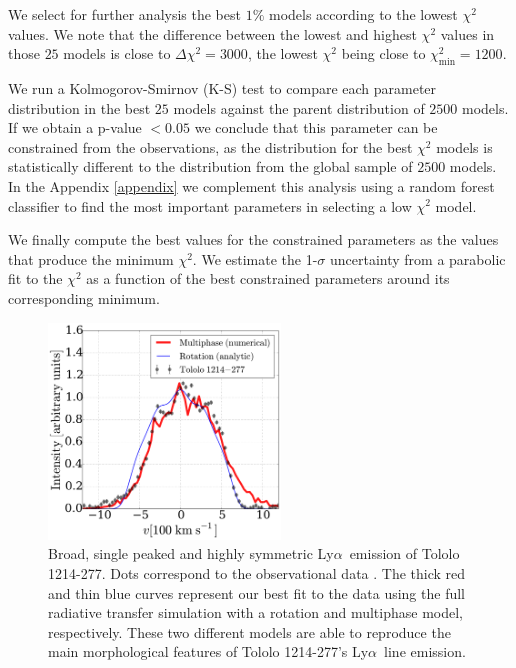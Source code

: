 \documentclass[a4paper,fleqn,usenatbib]{mnras}
\newcommand{\tol}{Tololo 1214-277}
\newcommand{\lya}{\ifmmode{{\rm Ly}\alpha}\else Ly$\alpha$\ \fi}
\begin{document}
We select for further analysis the best $1\%$ models according to the
lowest $\chi^2$ values.
We note that the difference between the lowest and highest $\chi^2$ values in
those $25$ models is close to $\Delta\chi^2 = 3000$, the lowest
$\chi^2$ being close to $\chi^2_{\mathrm{min}}=1200$. 

We run a Kolmogorov-Smirnov (K-S) test to compare each parameter
distribution in the best $25$ models against the parent distribution
of $2500$ models. 
If we obtain a p-value $<0.05$ we conclude that
this parameter can be constrained from the observations, as the distribution for
the best $\chi^2$ models is statistically different to the
distribution from the global sample of $2500$ models.  
In the Appendix \ref{appendix} we complement this analysis using a
random forest classifier to find the most important parameters in
selecting a low $\chi^2$ model.    


We finally compute the best values for the constrained parameters as
the values that produce the minimum $\chi^2$.  
We estimate the 1-$\sigma$ uncertainty from a parabolic fit to the
$\chi^2$ as a function of the best constrained parameters around its
corresponding minimum.   



\begin{figure}
\begin{center}
\includegraphics[width=0.55\textwidth]{CLARA-TOL-main.pdf}
\caption{Broad, single peaked and highly symmetric \lya emission of \tol.
  Dots correspond to the observational data \citep{mashesse03}. 
The thick red and thin blue curves represent our best fit
to the data using the full radiative transfer simulation with a
rotation and multiphase model, respectively. 
These two different models are able to reproduce the main morphological
features of \tol's \lya line emission.\label{fig:results}}
\end{center}
\end{figure}
\end{document}

